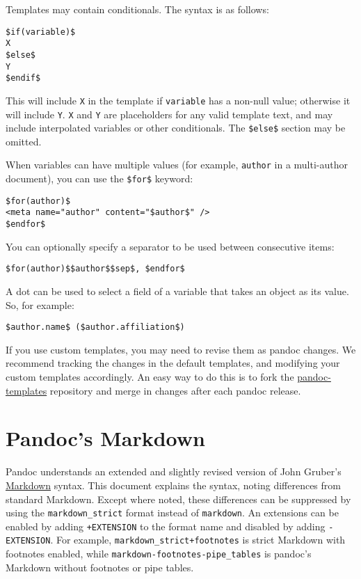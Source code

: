 \documentclass[]{article}
\begin{document}
Templates may contain conditionals. The syntax is as follows:

\begin{verbatim}
$if(variable)$
X
$else$
Y
$endif$
\end{verbatim}

This will include \texttt{X} in the template if \texttt{variable} has a
non-null value; otherwise it will include \texttt{Y}. \texttt{X} and
\texttt{Y} are placeholders for any valid template text, and may include
interpolated variables or other conditionals. The \texttt{\$else\$}
section may be omitted.

When variables can have multiple values (for example, \texttt{author} in
a multi-author document), you can use the \texttt{\$for\$} keyword:

\begin{verbatim}
$for(author)$
<meta name="author" content="$author$" />
$endfor$
\end{verbatim}

You can optionally specify a separator to be used between consecutive
items:

\begin{verbatim}
$for(author)$$author$$sep$, $endfor$
\end{verbatim}

A dot can be used to select a field of a variable that takes an object
as its value. So, for example:

\begin{verbatim}
$author.name$ ($author.affiliation$)
\end{verbatim}

If you use custom templates, you may need to revise them as pandoc
changes. We recommend tracking the changes in the default templates, and
modifying your custom templates accordingly. An easy way to do this is
to fork the
\href{https://github.com/jgm/pandoc-templates}{pandoc-templates}
repository and merge in changes after each pandoc release.

\hypertarget{pandocs-markdown}{\section{Pandoc's
Markdown}\label{pandocs-markdown}}

Pandoc understands an extended and slightly revised version of John
Gruber's \href{http://daringfireball.net/projects/markdown/}{Markdown}
syntax. This document explains the syntax, noting differences from
standard Markdown. Except where noted, these differences can be
suppressed by using the \texttt{markdown\_strict} format instead of
\texttt{markdown}. An extensions can be enabled by adding
\texttt{+EXTENSION} to the format name and disabled by adding
\texttt{-EXTENSION}. For example, \texttt{markdown\_strict+footnotes} is
strict Markdown with footnotes enabled, while
\texttt{markdown-footnotes-pipe\_tables} is pandoc's Markdown without
footnotes or pipe tables.
\end{document}
